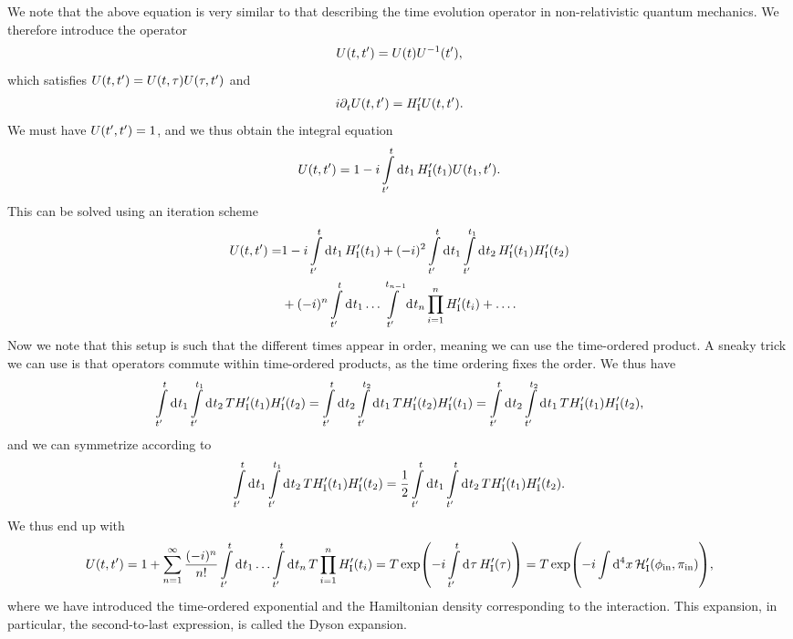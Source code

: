 We note that the above equation is very similar to that describing the time evolution operator in non-relativistic quantum mechanics. We therefore introduce the operator
\begin{align*}
	U(t, t^{\prime}) = U(t)U^{-1}(t^{\prime}),
\end{align*}
which satisfies $U(t, t^{\prime}) = U(t, \tau)U(\tau, t^{\prime})$ and
\begin{align*}
	i\partial^{}_{t}U(t, t^{\prime}) = H_{\text{I}}^{\prime} U(t, t^{\prime}).
\end{align*}
We must have $U(t^{\prime}, t^{\prime}) = 1$, and we thus obtain the integral equation
\begin{align*}
	U(t, t^{\prime}) = 1 -i\int\limits_{t^{\prime}}^{t}\dd[]{t_{1}}H_{\text{I}}^{\prime}(t_{1})U(t_{1}, t^{\prime}).
\end{align*}
This can be solved using an iteration scheme
\begin{align*}
	U(t, t\p) =& 1 -i\integ{t\p}{t}{t_{1}}{H_{\text{I}}\p(t_{1})} + (-i)^{2}\integ{t\p}{t}{t_{1}}{\integ{t\p}{t_{1}}{t_{2}}{H_{\text{I}}\p(t_{1})H_{\text{I}}\p(t_{2})}} \\
	           &+ (-i)^{n}\integ{t\p}{t}{t_{1}}{\dots\integ{t\p}{t_{n - 1}}{t_{n}}{\prod\limits_{i = 1}^{n}H_{\text{I}}\p(t_{i})}} + \dots.
\end{align*}
Now we note that this setup is such that the different times appear in order, meaning we can use the time-ordered product. A sneaky trick we can use is that operators commute within time-ordered products, as the time ordering fixes the order. We thus have
\begin{align*}
	\int\limits_{t^{\prime}}^{t}\dd[]{t_{1}}\int\limits_{t^{\prime}}^{t_{1}}\dd[]{t_{2}}T{H_{\text{I}}^{\prime}(t_{1})}{H_{\text{I}}^{\prime}(t_{2})} = \int\limits_{t^{\prime}}^{t}\dd[]{t_{2}}\int\limits_{t^{\prime}}^{t_{2}}\dd[]{t_{1}}T{H_{\text{I}}^{\prime}(t_{2})}{H_{\text{I}}^{\prime}(t_{1})} = \int\limits_{t^{\prime}}^{t}\dd[]{t_{2}}\int\limits_{t^{\prime}}^{t_{2}}\dd[]{t_{1}}T H_{\text{I}}^{\prime}(t_{1})H_{\text{I}}^{\prime}(t_{2}),
\end{align*}
and we can symmetrize according to
\begin{align*}
	\int\limits_{t^{\prime}}^{t}\dd[]{t_{1}}\int\limits_{t^{\prime}}^{t_{1}}\dd[]{t_{2}}T{H_{\text{I}}^{\prime}(t_{1})}{H_{\text{I}}^{\prime}(t_{2})} = \frac{1}{2}\int\limits_{t^{\prime}}^{t}\dd[]{t_{1}}\int\limits_{t^{\prime}}^{t}\dd[]{t_{2}}T{H_{\text{I}}^{\prime}(t_{1})}{H_{\text{I}}^{\prime}(t_{2})}.
\end{align*}
We thus end up with
\begin{align*}
	U(t, t\p) = 1 + \sum\limits_{n = 1}^{\infty}\frac{(-i)^{n}}{n!}\integ{t\p}{t}{t_{1}}{\dots\integ{t\p}{t}{t_{n}}{\torp\prod\limits_{i = 1}^{n}H_{\text{I}}\p(t_{i})}} = \torp\exp(-i\integ{t\p}{t}{\tau}{H_{\text{I}}\p(\tau)}) = \torp\exp(-i\integ[4]{}{}{x}{\ham_{\text{I}}\p(\phi_{\text{in}}, \pi_{\text{in}})}),
\end{align*}
where we have introduced the time-ordered exponential and the Hamiltonian density corresponding to the interaction. This expansion, in particular, the second-to-last expression, is called the Dyson expansion.


